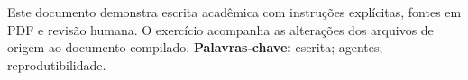 \begin{resumo}
Este documento demonstra escrita acadêmica com instruções explícitas, fontes em PDF e revisão humana. O exercício acompanha as alterações dos arquivos de origem ao documento compilado.
\vspace{\onelineskip}
\noindent\textbf{Palavras-chave:} escrita; agentes; reprodutibilidade.
\end{resumo}
